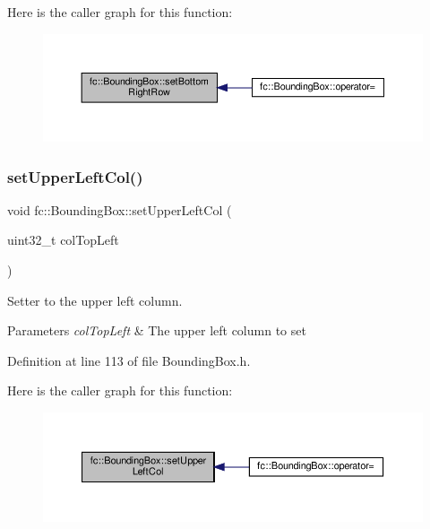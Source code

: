 Here is the caller graph for this function\+:
\nopagebreak
\begin{figure}[H]
\begin{center}
\leavevmode
\includegraphics[width=350pt]{db/dc1/classfc_1_1BoundingBox_a88812242713670dc43c3137b0a962cbe_icgraph}
\end{center}
\end{figure}
\mbox{\label{classfc_1_1BoundingBox_aabde814367dcfa4d1f1e23042d655cc4}} 
\subsubsection{\texorpdfstring{set\+Upper\+Left\+Col()}{setUpperLeftCol()}}
{\footnotesize\ttfamily void fc\+::\+Bounding\+Box\+::set\+Upper\+Left\+Col (\begin{DoxyParamCaption}\item[{uint32\+\_\+t}]{col\+Top\+Left }\end{DoxyParamCaption})\hspace{0.3cm}{\ttfamily [inline]}}



Setter to the upper left column. 


\begin{DoxyParams}{Parameters}
{\em col\+Top\+Left} & The upper left column to set \\
\hline
\end{DoxyParams}


Definition at line 113 of file Bounding\+Box.\+h.

Here is the caller graph for this function\+:
\nopagebreak
\begin{figure}[H]
\begin{center}
\leavevmode
\includegraphics[width=350pt]{db/dc1/classfc_1_1BoundingBox_aabde814367dcfa4d1f1e23042d655cc4_icgraph}
\end{center}
\end{figure}
\mbox{\label{classfc_1_1BoundingBox_a8007ac29ae2e3f15bfccf71d6f318716}} 
